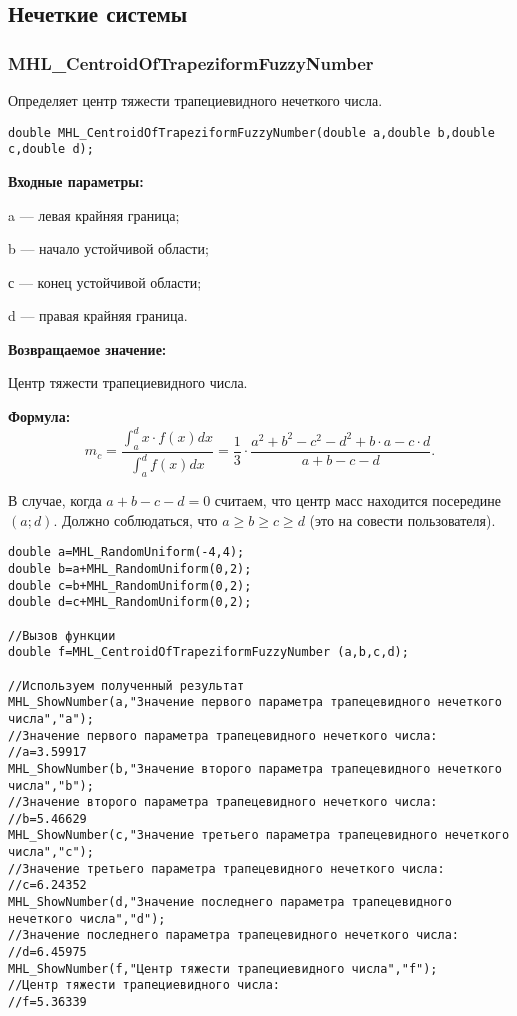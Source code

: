 \documentclass[a4paper,12pt]{article}
\begin{document}
\subsection{Нечеткие системы}

\subsubsection{MHL\_CentroidOfTrapeziformFuzzyNumber}\label{MHL_CentroidOfTrapeziformFuzzyNumber}

Определяет центр тяжести трапециевидного нечеткого числа.


\begin{lstlisting}[label=code_syntax_MHL_CentroidOfTrapeziformFuzzyNumber,caption=Синтаксис]
double MHL_CentroidOfTrapeziformFuzzyNumber(double a,double b,double c,double d);
\end{lstlisting}

\textbf{Входные параметры:}
 
a --- левая крайняя граница;
 
b --- начало устойчивой области;
 
с --- конец устойчивой области;
 
d --- правая крайняя граница.

\textbf{Возвращаемое значение:}
 
 Центр тяжести трапециевидного числа.

\textbf{Формула:}
\begin{equation*}
m_c=\dfrac{\int_{a}^{d} x\cdot f(x) dx}{\int_{a}^{d} f(x) dx}  =\dfrac{1}{3}\cdot\dfrac{a^2+b^2-c^2-d^2+b\cdot a-c\cdot d}{a+b-c-d}.
\end{equation*}

В случае, когда $a+b-c-d=0$ считаем, что центр масс находится посередине $(a;d)$. Должно соблюдаться, что $a\geq b \geq c \geq d$ (это на совести пользователя).


\begin{lstlisting}[label=code_use_MHL_CentroidOfTrapeziformFuzzyNumber,caption=Пример использования]
double a=MHL_RandomUniform(-4,4);
double b=a+MHL_RandomUniform(0,2);
double c=b+MHL_RandomUniform(0,2);
double d=c+MHL_RandomUniform(0,2);

//Вызов функции
double f=MHL_CentroidOfTrapeziformFuzzyNumber (a,b,c,d);

//Используем полученный результат
MHL_ShowNumber(a,"Значение первого параметра трапецевидного нечеткого числа","a");
//Значение первого параметра трапецевидного нечеткого числа:
//a=3.59917
MHL_ShowNumber(b,"Значение второго параметра трапецевидного нечеткого числа","b");
//Значение второго параметра трапецевидного нечеткого числа:
//b=5.46629
MHL_ShowNumber(c,"Значение третьего параметра трапецевидного нечеткого числа","c");
//Значение третьего параметра трапецевидного нечеткого числа:
//c=6.24352
MHL_ShowNumber(d,"Значение последнего параметра трапецевидного нечеткого числа","d");
//Значение последнего параметра трапецевидного нечеткого числа:
//d=6.45975
MHL_ShowNumber(f,"Центр тяжести трапециевидного числа","f");
//Центр тяжести трапециевидного числа:
//f=5.36339
\end{lstlisting}
\end{document}
